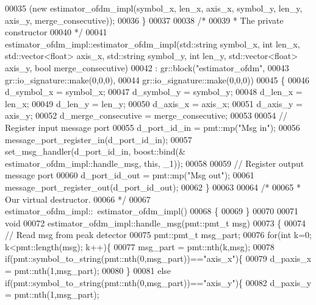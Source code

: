 \begin{DoxyCode}
00035         (\textcolor{keyword}{new} estimator_ofdm_impl(symbol\_x, len\_x, axis\_x, symbol\_y, len\_y, axis\_y, merge\_consecutive));
00036     \}
00037 
00038     \textcolor{comment}{/*}
00039 \textcolor{comment}{     * The private constructor}
00040 \textcolor{comment}{     */}
00041     estimator_ofdm_impl::estimator_ofdm_impl(std::string symbol\_x, \textcolor{keywordtype}{int} len\_x, std::vector<float> axis\_x, 
      std::string symbol\_y, \textcolor{keywordtype}{int} len\_y, std::vector<float> axis\_y, \textcolor{keywordtype}{bool} merge\_consecutive)
00042       : gr::block(\textcolor{stringliteral}{"estimator\_ofdm"},
00043               gr::io\_signature::make(0,0,0),
00044               gr::io\_signature::make(0,0,0))
00045     \{
00046         d_symbol_x = symbol\_x;
00047         d_symbol_y = symbol\_y;
00048         d_len_x = len\_x;
00049         d_len_y = len\_y;
00050         d_axis_x = axis\_x;
00051         d_axis_y = axis\_y;
00052         d_merge_consecutive = merge\_consecutive;
00053         
00054         \textcolor{comment}{// Register input message port}
00055         d_port_id_in = pmt::mp(\textcolor{stringliteral}{"Msg in"});
00056         message\_port\_register\_in(d_port_id_in);
00057         set\_msg\_handler(d_port_id_in, boost::bind(&
      estimator_ofdm_impl::handle_msg, \textcolor{keyword}{this}, \_1));
00058         
00059         \textcolor{comment}{// Register output message port}
00060         d_port_id_out = pmt::mp(\textcolor{stringliteral}{"Msg out"});
00061         message\_port\_register\_out(d_port_id_out);
00062     \}
00063 
00064     \textcolor{comment}{/*}
00065 \textcolor{comment}{     * Our virtual destructor.}
00066 \textcolor{comment}{     */}
00067     estimator_ofdm_impl::~estimator_ofdm_impl()
00068     \{
00069     \}
00070     
00071     \textcolor{keywordtype}{void}
00072     estimator_ofdm_impl::handle_msg(pmt::pmt\_t msg)
00073     \{
00074         \textcolor{comment}{// Read msg from peak detector}
00075         pmt::pmt\_t msg\_part;
00076         \textcolor{keywordflow}{for}(\textcolor{keywordtype}{int} k=0; k<pmt::length(msg); k++)\{
00077             msg\_part = pmt::nth(k,msg);
00078             \textcolor{keywordflow}{if}(pmt::symbol\_to\_string(pmt::nth(0,msg\_part))==\textcolor{stringliteral}{"axis\_x"})\{
00079                 d_paxis_x = pmt::nth(1,msg\_part);
00080             \}
00081             \textcolor{keywordflow}{else} \textcolor{keywordflow}{if}(pmt::symbol\_to\_string(pmt::nth(0,msg\_part))==\textcolor{stringliteral}{"axis\_y"})\{
00082                 d_paxis_y = pmt::nth(1,msg\_part);

\end{DoxyCode}
